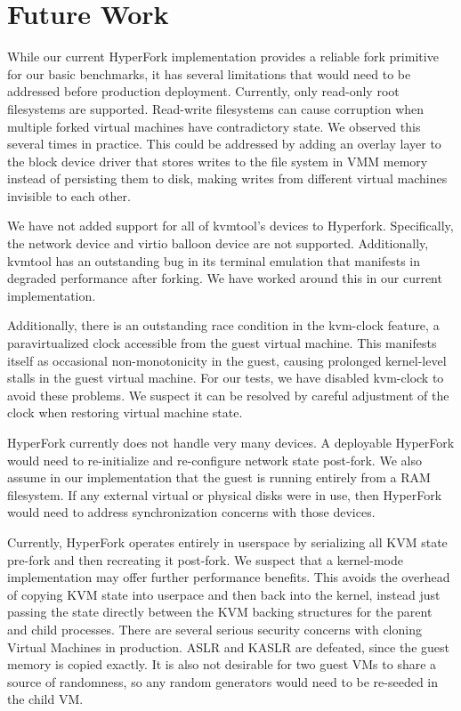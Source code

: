 \section{Future Work} \label{sec:future}

 While our current HyperFork implementation
provides a reliable fork primitive for our basic benchmarks, it has several
limitations that would need to be addressed before production deployment.
Currently, only read-only root filesystems are supported. Read-write
filesystems can cause corruption when multiple forked virtual machines have
contradictory state. We observed this several times in practice. This could be
addressed by adding an overlay layer to the block device driver that stores
writes to the file system in VMM memory instead of persisting them to disk,
making writes from different virtual machines invisible to each other.

We have not added support for all of kvmtool's devices to Hyperfork.
Specifically, the network device and virtio balloon device are not
supported. Additionally, kvmtool has an outstanding bug in its terminal
emulation that manifests in degraded performance after forking. We have worked
around this in our current implementation.

Additionally, there is an outstanding race condition in the kvm-clock feature,
a paravirtualized clock accessible from the guest virtual machine. This
manifests itself as occasional non-monotonicity in the guest, causing prolonged
kernel-level stalls in the guest virtual machine. For our tests, we have
disabled kvm-clock to avoid these problems. We suspect it can be resolved by
careful adjustment of the clock when restoring virtual machine state.


HyperFork currently does not handle very many devices. A deployable HyperFork
would need to re-initialize and re-configure network state post-fork. We also
assume in our implementation that the guest is running entirely from a RAM
filesystem. If any external virtual or physical disks were in use, then
HyperFork would need to address synchronization concerns with those devices.

Currently, HyperFork operates entirely in userspace by serializing all KVM
state pre-fork and then recreating it post-fork. We suspect that a kernel-mode
implementation may offer further performance benefits. This avoids the overhead
of copying KVM state into userpace and then back into the kernel, instead just
passing the state directly between the KVM backing structures for the parent
and child processes. There are several serious security concerns with cloning
Virtual Machines in production. ASLR and KASLR are defeated, since the guest
memory is copied exactly. It is also not desirable for two guest VMs to share a
source of randomness, so any random generators would need to be re-seeded in
the child VM.

